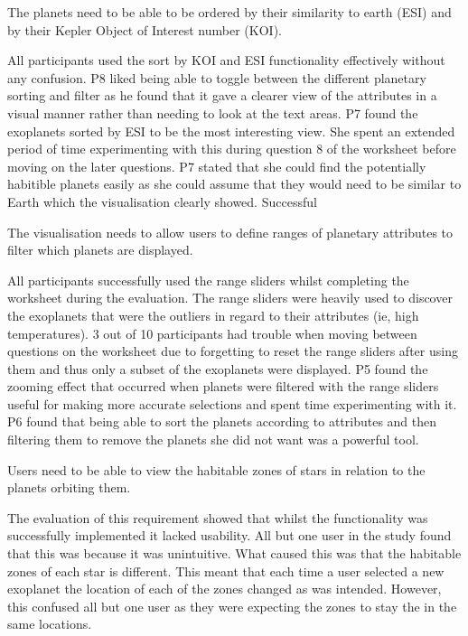 \begin{enumerate}
{\bf
 \item[R3.] The planets need to be able to be ordered by their similarity to
earth (ESI) and by their Kepler Object of Interest number (KOI).}
 
All participants used the sort by KOI and ESI functionality effectively without
any confusion. P8 liked being able to toggle between the different planetary
sorting and
filter as he found that it gave a clearer view of the attributes in a visual
manner rather than needing to look at the text areas.
P7 found the exoplanets sorted by ESI to be the most interesting view. She
spent
an extended period of time experimenting with this during question 8 of the
worksheet before moving on the later questions. P7 stated that she could find
the potentially habitible planets easily as she could assume that they would
need to be similar to Earth which the visualisation clearly showed.
Successful
 
{\bf \item[R4.] The visualisation needs to allow users to define ranges of
planetary attributes to filter which planets are displayed.}

All participants successfully used the range sliders whilst completing the
worksheet
during the evaluation. The range sliders were heavily used to discover the
exoplanets that were the outliers in regard to their attributes (ie, high
temperatures). 3 out of 10 participants had trouble when moving between
questions on the worksheet due to forgetting
to reset the range sliders after using them and thus only a subset of the
exoplanets were displayed. 
P5 found the zooming effect that occurred when planets were filtered with the
range sliders useful for making more accurate selections and spent time
experimenting with it. P6 found that being able to sort the planets according to
attributes and
then filtering them to remove the planets she did not want was a powerful tool.

{\bf \item[R5.] Users need to be able to view the habitable zones of stars in
relation to the planets orbiting them.}

The evaluation of this requirement showed that whilst the functionality was
successfully implemented it lacked usability. All but one user in the study
found that this was because it was unintuitive. What caused this was that the
habitable zones of each star is different. This meant that each time a user
selected a new exoplanet the location of each of the zones changed as was
intended. However, this confused all but one user as they were expecting the
zones to stay the in the same locations.  

\end{enumerate}

